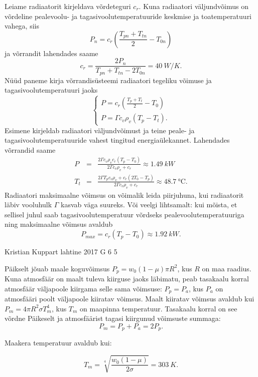 \documentclass[11pt]{article}
\begin{document}
{{\ifSolution
Leiame radiaatorit kirjeldava võrdeteguri $c_{r}$. Kuna radiaatori
väljundvõimus on võrdeline pealevoolu- ja tagasivoolutemperatuuride
keskmise ja toatemperatuuri vahega, siis
\[
P_{n}=c_{r}\left(\frac{T_{pn}+T_{tn}}{2}-T_{0n}\right)
\]
\noindent ja võrrandit lahendades saame
\[
c_{r}=\frac{2P_{n}}{T_{pn}+T_{tn}-2T_{0n}}=\SI{40}{W/K}.
\]
Nüüd paneme kirja võrrandisüsteemi radiaatori tegeliku võimuse ja
tagasivoolutemperatuuri jaoks
\[
\left\{ \begin{array}{c}
P=c_{r}\left(\frac{T_{p}+T_{t}}{2}-T_{0}\right)\\
P=\Gamma c_{v}\rho_{v}\left(T_{p}-T_{t}\right).
\end{array}\right.
\]
Esimene kirjeldab radiaatori väljundvõimust ja teine peale- ja tagasivoolutemperatuuride
vahest tingitud energiaülekannet. Lahendades võrrandid saame 
\begin{eqnarray*}
P & = & \frac{2\Gamma c_{v}\rho_{v}c_{r}\left(T_{p}-T_{0}\right)}{2\Gamma c_{v}\rho_{v}+c_{r}}\approx\SI{1.49}{kW}\\
T_{t} & = & \frac{2\Gamma T_{p}c_{v}\rho_{v}+c_{r}\left(2T_{0}-T_{p}\right)}{2\Gamma c_{v}\rho_{v}+c_{r}}\approx\SI{48.7}{\celsius}.
\end{eqnarray*}
Radiaatori maksimaalne võimsus on võimalik leida piirjuhuna, kui radiaatorit
läbiv vooluhulk $\Gamma$ kasvab väga suureks. Või veelgi lihtsamalt:
kui mõista, et sellisel juhul saab tagasivoolutemperatuur võrdseks
pealevoolutemperatuuriga ning maksimaalne võimsus avaldub
\[
P_{max}=c_{r}\left(T_{p}-T_{0}\right)\approx\SI{1.92}{kW}.
\]
\fi
}

{Kristian Kuppart} %
{lahtine} %
{2017} %
{G 6} %
{5} %
{

\ifSolution
Päikselt jõuab maale koguvõimsus $P_p=w_0 \left(1-\mu\right)\pi R^2$, kus $R$ on maa raadius. Kuna atmosfäär on maalt tuleva kiirguse jaoks läbimatu, peab tasakaalu korral atmosfäär väljapoole kiirgama selle sama võimsuse: $P_p=P_a$, kus $P_a$ on atmosfääri poolt väljapoole kiiratav võimsus. Maalt kiiratav võimsus avaldub kui $P_m=4 \pi R^2 \sigma T_m^4$, kus $T_m$ on maapinna temperatuur. Tasakaalu korral on see võrdne Päikeselt ja atmosfäärist tagasi kiirgunud võimsuste summaga:
\[P_m=P_p+P_a=2P_p.\]

Maakera temperatuur avaldub kui:

\[T_m=\sqrt[4]{\frac{w_0\left(1-\mu\right)}{2\sigma}}=\SI{303}{K}.\]
\fi
}

}
\end{document}
